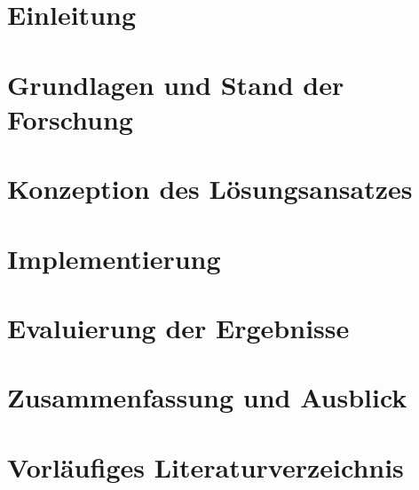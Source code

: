 \documentclass[
  11pt,
  a4paper,
  oneside,
  titlepage,
  numbers=noenddot
]{scrartcl}
\begin{document}
\tableofcontents
\clearpage

\setcounter{page}{1}   %


\section{Einleitung}


\clearpage
\section{Grundlagen und Stand der Forschung}


\clearpage
\section{Konzeption des Lösungsansatzes}


\clearpage
\section{Implementierung}


\clearpage
\section{Evaluierung der Ergebnisse}


\clearpage
\section{Zusammenfassung und Ausblick}


\clearpage
\appendix

\section{Vorläufiges Literaturverzeichnis}
\printbibliography
\end{document}
